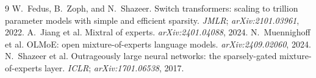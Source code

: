 \documentclass{article}
\begin{document}
{\small
\begin{thebibliography}{9}
\itemsep1.5pt
 W.~Fedus, B.~Zoph, and N.~Shazeer.
Switch transformers: scaling to trillion parameter models with simple and
efficient sparsity. \emph{JMLR}; \emph{arXiv:2101.03961}, 2022.
 A.~Jiang et al. Mixtral of experts.
\emph{arXiv:2401.04088}, 2024.
 N.~Muennighoff et al.
OLMoE: open mixture-of-experts language models. \emph{arXiv:2409.02060}, 2024.
 N.~Shazeer et al. Outrageously
large neural networks: the sparsely-gated mixture-of-experts layer.
\emph{ICLR}; \emph{arXiv:1701.06538}, 2017.
\end{thebibliography}
}
\end{document}
